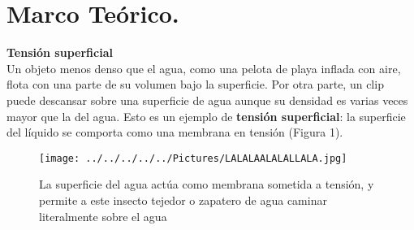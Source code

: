 \documentclass[10pt,a4paper]{article}
\begin{document}
\section{Marco Te\'{o}rico.}
\textbf{Tensi\'{o}n superficial} 
\\
Un objeto menos denso que el agua, como una pelota de playa inflada con aire, flota con una parte de su volumen bajo la superficie. Por otra parte, un clip puede descansar sobre una superficie de agua aunque su densidad es varias veces mayor que la del agua. Esto es un ejemplo de \textbf{tensi\'{o}n superficial}: la superficie del l\'{i}quido se comporta como una membrana en tensi\'{o}n (Figura 1).
\\
\begin{figure}[hbtp]
\centering
\texttt{[image: ../../../../../Pictures/LALALAALALALLALA.jpg]}
\caption{La superficie del agua act\'{u}a como membrana sometida a tensi\'{o}n, y permite a este insecto tejedor o zapatero de agua caminar literalmente sobre el agua}
\end{figure}
\\
\end{document}
